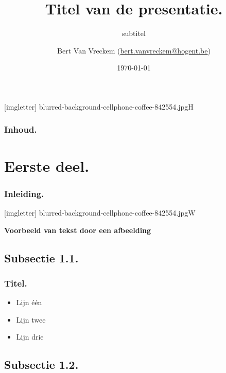 \documentclass[aspectratio=169]{beamer}
\title[Korte titel]{Titel van de presentatie.}
\subtitle{subtitel}
\author[BVV]{Bert {Van Vreckem} (\href{mailto:bert.vanvreckem@hogent.be}
    {bert.vanvreckem@hogent.be})}
\date{\today}
\begin{document}
{
[imgletter]
    {blurred-background-cellphone-coffee-842554.jpg}{H}

\begin{frame}
    \maketitle
\end{frame}
}

\begin{frame}
    \frametitle{Inhoud.}

    \tableofcontents
\end{frame}

\section{Eerste deel.}

\begin{frame}
    \frametitle{Inleiding.}

    \lipsum*[2]
\end{frame}

{
[imgletter]
    {blurred-background-cellphone-coffee-842554.jpg}{W}

\begin{frame}
    {\huge \textbf{Voorbeeld van tekst door een afbeelding}}
\end{frame}
}

\subsection{Subsectie 1.1.}

\begin{frame}
    \frametitle{Titel.}

    \begin{itemize}
        \item Lijn één
        \item Lijn twee
        \item Lijn drie
    \end{itemize}
\end{frame}

\subsection{Subsectie 1.2.}
\end{document}
